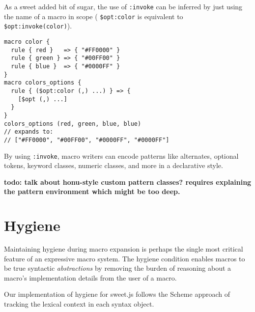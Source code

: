 \documentclass[preprint,10pt]{sigplanconf}
\begin{document}
As a sweet added bit of sugar, the use of \verb!:invoke! can be
inferred by just using the name of a macro in scope (\ie
\verb!$opt:color! is equivalent to
\verb!$opt:invoke(color)!).

\begin{lstlisting}
macro color {
  rule { red }   => { "#FF0000" }
  rule { green } => { "#00FF00" }
  rule { blue }  => { "#0000FF" }
}
macro colors_options {
  rule { ($opt:color (,) ...) } => { 
    [$opt (,) ...]
  }
}
colors_options (red, green, blue, blue)
// expands to:
// ["#FF0000", "#00FF00", "#0000FF", "#0000FF"]
\end{lstlisting}

By using \verb!:invoke!, macro writers can encode patterns
like alternates, optional tokens, keyword classes, numeric classes,
and more in a declarative style.

\textbf{todo: talk about honu-style custom pattern classes? requires
  explaining the pattern environment which might be too deep.}





\section{Hygiene}
\label{sec:hygiene}

Maintaining hygiene during macro expansion is perhaps the single most
critical feature of an expressive macro system. The hygiene condition
enables macros to be true syntactic \emph{abstractions} by removing
the burden of reasoning about a macro's implementation details from the
user of a macro.

Our implementation of hygiene for sweet.js follows the Scheme approach
\cite{Hieb1992,Flatt2012} of tracking the lexical context in each
syntax object.
\end{document}
